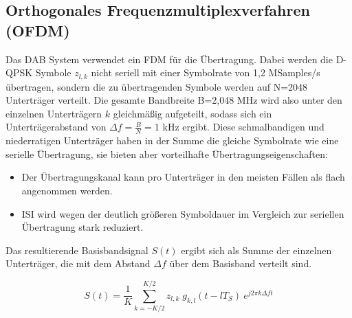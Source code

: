 \subsection{Orthogonales Frequenzmultiplexverfahren (OFDM)}
\label{sec:ofdm}
Das DAB System verwendet ein \ac{FDM} für die Übertragung. Dabei werden die D-QPSK Symbole $z_{l,k}$ nicht seriell mit einer Symbolrate von 1,2 MSamples/s übertragen, sondern die zu übertragenden Symbole werden auf N=2048 Unterträger verteilt. Die gesamte Bandbreite B=2,048 MHz wird also unter den einzelnen Unterträgern $k$ gleichmäßig aufgeteilt, sodass sich ein Unterträgerabstand von $\Delta f = \frac{B}{N} = 1$ kHz ergibt. Diese schmalbandigen und niederratigen Unterträger haben in der Summe die gleiche Symbolrate wie eine serielle Übertragung, sie bieten aber vorteilhafte Übertragungseigenschaften:
\begin{itemize}
\item Der Übertragungskanal kann pro Unterträger in den meisten Fällen als flach angenommen werden.
\item \ac{ISI} wird wegen der deutlich größeren Symboldauer im Vergleich zur seriellen Übertragung stark reduziert.
\end{itemize}
Das resultierende Basisbandsignal $S(t)$ ergibt sich als Summe der einzelnen Unterträger, die mit dem Abstand $\Delta f$ über dem Basisband verteilt sind.

\begin{equation}
    S(t) = \frac{1}{K} \sum \limits_{k=-K/2}^{K/2} z_{l,k} \; g_{k,l}(t-lT_S) \: e^{j2\pi k \Delta f t}
\label{eq:ofdm_dft}
\end{equation}

